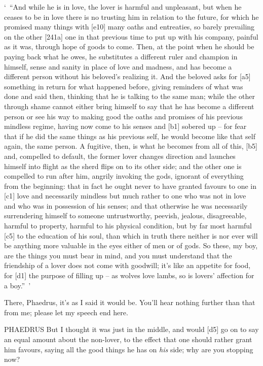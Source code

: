 ‘~“And while he is in love, the lover is harmful and unpleasant, but
when he ceases to be in love there is no trusting him in relation to the
future, for which he promised many things with {[}e10{]} many oaths and
entreaties, so barely prevailing on the other {[}241a{]} one in that
previous time to put up with his company, painful as it was, through
hope of goods to come. Then, at the point when he should be paying back
what he owes, he substitutes a different ruler and champion in himself,
sense and sanity in place of love and madness, and has become a
different person without his beloved's realizing it. And the beloved
asks for {[}a5{]} something in return for what happened
before, giving reminders
of what was done and said then, thinking that he is talking to the same
man; while the other through shame cannot either bring himself to say
that he has become a different person or see his way to making good the
oaths and promises of his previous mindless regime, having now come to
his senses and {[}b1{]} sobered
up -- for fear that if he
did the same things as his previous self, he would become like that self
again, the same person. A fugitive, then, is what he becomes from all of
this, {[}b5{]} and, compelled to default, the former lover changes
direction and launches himself into flight as the sherd flips on to its
other side; and the other
one is compelled to run after him, angrily invoking the gods, ignorant
of everything from the beginning: that in fact he ought never to have
granted favours to one in {[}c1{]} love and
necessarily mindless but
much rather to one who was not in love and who was in possession of his
senses; and that otherwise he was necessarily surrendering himself to
someone untrustworthy, peevish, jealous, disagreeable, harmful to
property, harmful to his physical condition, but by far most harmful
{[}c5{]} to the education of his soul, than which in truth there neither
is nor ever will be anything more valuable in the eyes either of men or
of gods. So these, my boy, are the things you must bear in mind, and you
must understand that the friendship of a lover does not come with
goodwill; it's like an appetite for food, for {[}d1{]} the purpose of
filling up -- as wolves love lambs, so is lovers' affection for a
boy.”~'

There, Phaedrus, it's as I said it would
be. You'll hear nothing
further than that from me; please let my speech end here.

PHAEDRUS But I thought it was just in the middle, and would {[}d5{]} go
on to say an equal amount about the non-lover, to the effect that one
should rather grant him favours, saying all the good things he has on
{\em his} side; why are you stopping now?

